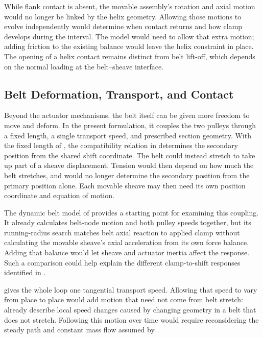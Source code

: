 \documentclass[11pt]{report}
\numberwithin{equation}{section}
\newcounter{assump}
\begin{document}
While flank contact is absent, the movable assembly's rotation and axial
motion would no longer be linked by the helix geometry. Allowing those motions
to evolve independently would determine when contact returns and how clamp
develops during the interval. The model would need to allow that extra motion;
adding friction to the existing balance would leave the helix constraint in
place. The opening of a helix contact remains distinct from belt lift-off,
which depends on the normal loading at the belt--sheave interface.

\subsection*{Belt Deformation, Transport, and Contact}
\label{sec:future_work_belt_material}

Beyond the actuator mechanisms, the belt itself can be given more freedom to
move and deform. In the present formulation, it couples the two pulleys through
a fixed length, a single transport speed, and prescribed section geometry.
With the fixed length of , the compatibility
relation in  determines the secondary
position from the shared shift coordinate. The belt could instead stretch to
take up part of a sheave displacement. Tension would then depend on how much
the belt stretches, and  would no longer
determine the secondary position from the primary position alone. Each movable
sheave may then need its own position coordinate and equation of motion.

The dynamic belt model of \citet{Ballew2015} provides a starting point for
examining this coupling. It already calculates belt-node motion and both
pulley speeds together, but its running-radius search matches belt axial
reaction to applied clamp without calculating the movable sheave's axial
acceleration from its own force balance. Adding that balance would let sheave
and actuator inertia affect the response. Such a comparison could help explain
the different clamp-to-shift responses identified in
.

 gives the whole loop one tangential
transport speed. Allowing that speed to vary from place to place would add
motion that need not come from belt stretch:
\citet{CarboneMangialardiMantriota2005} already describe local speed changes
caused by changing geometry in a belt that does not stretch. Following this
motion over time would require reconsidering the steady path and constant mass
flow assumed by \citet{Messick2018}.
\end{document}
